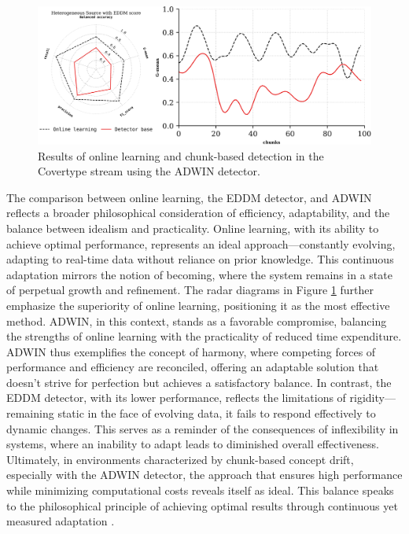 \begin{figure}[H]
	\centering
	\includegraphics[width=1\linewidth]{6_transfer_learning/figures/exp5.png}
  \caption{Results of online learning and chunk-based detection in the Covertype stream using the ADWIN detector.}
	\label{fig:6_exp7}
\end{figure}
The comparison between online learning, the EDDM detector, and ADWIN reflects a broader philosophical consideration of efficiency, adaptability, and the balance between idealism and practicality. Online learning, with its ability to achieve optimal performance, represents an ideal approach—constantly evolving, adapting to real-time data without reliance on prior knowledge. This continuous adaptation mirrors the notion of becoming, where the system remains in a state of perpetual growth and refinement. The radar diagrams in Figure \ref{fig:6_exp7} further emphasize the superiority of online learning, positioning it as the most effective method. ADWIN, in this context, stands as a favorable compromise, balancing the strengths of online learning with the practicality of reduced time expenditure. ADWIN thus exemplifies the concept of harmony, where competing forces of performance and efficiency are reconciled, offering an adaptable solution that doesn’t strive for perfection but achieves a satisfactory balance. In contrast, the EDDM detector, with its lower performance, reflects the limitations of rigidity—remaining static in the face of evolving data, it fails to respond effectively to dynamic changes. This serves as a reminder of the consequences of inflexibility in systems, where an inability to adapt leads to diminished overall effectiveness. Ultimately, in environments characterized by chunk-based concept drift, especially with the ADWIN detector, the approach that ensures high performance while minimizing computational costs reveals itself as ideal. This balance speaks to the philosophical principle of achieving optimal results through continuous yet measured adaptation \cite{gama2004learning, madkour2023historical}.

